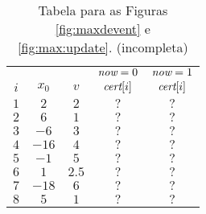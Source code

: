 \begin{table}[htb]
    \begin{tabular}{|c|c|c|c|c|}
        \hline
            & & & $\textit{now} = 0$ & $\textit{now} = 1$ \\
        $i$ & $x_0$ & $v$ & $\textit{cert}[i]$ & $\textit{cert}[i]$ \\
        \hline
        $1$ & $2$ & $2$ & $?$ & $?$ \\

        $2$ & $6$ & $1$ & $?$ & $?$ \\

        $3$ & $-6$ & $3$ & $?$ & $?$ \\

        $4$ & $-16$ & $4$ & $?$ & $?$ \\

        $5$ & $-1$ & $5$ & $?$ & $?$ \\

        $6$ & $1$ & $2.5$ & $?$ & $?$ \\

        $7$ & $-18$ & $6$ & $?$ & $?$ \\

        $8$ & $5$ & $1$ & $?$ & $?$ \\

        \hline
    \end{tabular}
    \caption{Tabela para as Figuras \ref{fig:maxdevent} e
    \ref{fig:max:update}. (incompleta)}
\end{table}
